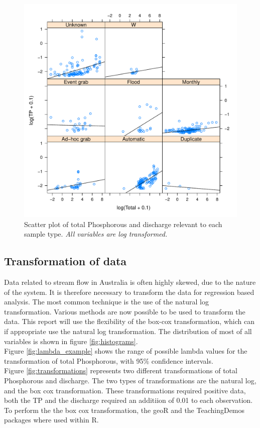 \documentclass[5p]{elsarticle}
\begin{document}
\begin{center}
\begin{figure}
\includegraphics[scale=0.5]{sample_tp_scatter.pdf}
\caption{Scatter plot of total Phosphorous and discharge relevant to each sample type. \it{All variables are log transformed.}}
\label{fig:sample_scatter}
\end{figure}
\end{center}


\subsection*{Transformation of data}
Data related to stream flow in Australia is often highly skewed, due to the nature of the system. It is therefore necessary to transform the data for regression based analysis. The most common technique is the use of the natural log transformation. Various methods are now possible to be used to transform the data. This report will use the flexibility of the box-cox transformation, which can if appropriate use the natural log transformation. The distribution of most of all variables is shown in figure \ref{fig:histograms}.\\
Figure \ref{fig:lambda_example} shows the range of possible lambda values for the transformation of total Phosphorous, with 95\% confidence intervals.\\
Figure \ref{fig:transformations} represents two different transformations of total Phosphorous and discharge. The two types of transformations are the natural log, and the box cox transformation. These transformations required positive data, both the TP and the discharge required an additiion of 0.01 to each observation. To perform the the box cox transformation, the geoR and the TeachingDemos packages where used within R. 
\end{document}
